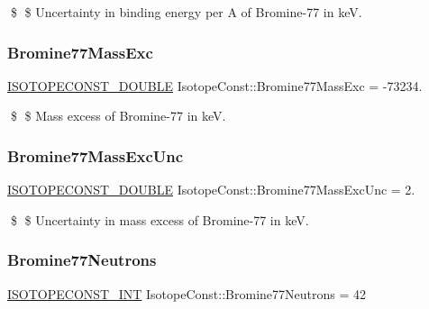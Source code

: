 \$ \$ Uncertainty in binding energy per A of Bromine-\/77 in keV. \mbox{\label{group___isotope_const-_bromine-_br77_gae643f78a0a12d6467d63543a947814b0}} 
\subsubsection{\texorpdfstring{Bromine77\+Mass\+Exc}{Bromine77MassExc}}
{\footnotesize\ttfamily \mbox{\hyperlink{group___isotope_const-_macros_ga8f45a7272ce02c0b4c65c44636ed719a}{I\+S\+O\+T\+O\+P\+E\+C\+O\+N\+S\+T\+\_\+\+D\+O\+U\+B\+LE}} Isotope\+Const\+::\+Bromine77\+Mass\+Exc = -\/73234.}

\$ \$ Mass excess of Bromine-\/77 in keV. \mbox{\label{group___isotope_const-_bromine-_br77_ga9d1d7049250cc7b57be7c67166a4db5c}} 
\subsubsection{\texorpdfstring{Bromine77\+Mass\+Exc\+Unc}{Bromine77MassExcUnc}}
{\footnotesize\ttfamily \mbox{\hyperlink{group___isotope_const-_macros_ga8f45a7272ce02c0b4c65c44636ed719a}{I\+S\+O\+T\+O\+P\+E\+C\+O\+N\+S\+T\+\_\+\+D\+O\+U\+B\+LE}} Isotope\+Const\+::\+Bromine77\+Mass\+Exc\+Unc = 2.}

\$ \$ Uncertainty in mass excess of Bromine-\/77 in keV. \mbox{\label{group___isotope_const-_bromine-_br77_ga518cb95c0a8993d4190f611cdaad8c1c}} 
\subsubsection{\texorpdfstring{Bromine77\+Neutrons}{Bromine77Neutrons}}
{\footnotesize\ttfamily \mbox{\hyperlink{group___isotope_const-_macros_ga5f18360b3e99483a35c32d789e62621c}{I\+S\+O\+T\+O\+P\+E\+C\+O\+N\+S\+T\+\_\+\+I\+NT}} Isotope\+Const\+::\+Bromine77\+Neutrons = 42}

